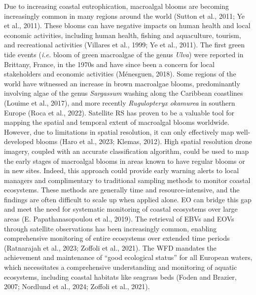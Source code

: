 \documentclass[
  letterpaper,
  11pt,
  english,
  singlespacing,
  headsepline]{MastersDoctoralThesis}
\begin{document}
\begin{spacing}{1.5}
Due to increasing coastal eutrophication, macroalgal blooms are becoming
increasingly common in many regions around the world (Sutton et al.,
2011; Ye et al., 2011). These blooms can have negative impacts on human
health and local economic activities, including human health, fishing
and aquaculture, tourism, and recreational activities (Villares et al.,
1999; Ye et al., 2011). The first green tide events (\emph{i.e.} bloom
of green macroalgae of the genus \emph{Ulva}) were reported in Brittany,
France, in the 1970s and have since been a concern for local
stakeholders and economic activities (Ménesguen, 2018). Some regions of
the world have witnessed an increase in brown macroalgae blooms,
predominantly involving algae of the genus \emph{Sargassum} washing
along the Caribbean coastlines (Louime et al., 2017), and more recently
\emph{Rugulopteryx okamurea} in southern Europe (Roca et al., 2022).
Satellite RS has proven to be a valuable tool for mapping the spatial
and temporal extent of macroalgal blooms worldwide. However, due to
limitations in spatial resolution, it can only effectively map
well-developed blooms (Haro et al., 2023; Klemas, 2012). High spatial
resolution drone imagery, coupled with an accurate classification
algorithm, could be used to map the early stages of macroalgal blooms in
areas known to have regular blooms or in new sites. Indeed, this
approach could provide early warning alerts to local managers and
complimentary to traditional sampling methods to monitor coastal
ecosystems. These methods are generally time and resource-intensive, and
the findings are often difficult to scale up when applied alone. EO can
bridge this gap and meet the need for systematic monitoring of coastal
ecosystems over large areas (E. Papathanasopoulou et al., 2019). The
retrieval of EBVs and EOVs through satellite observations has been
increasingly common, enabling comprehensive monitoring of entire
ecosystems over extended time periods (Ratnarajah et al., 2023; Zoffoli
et al., 2021). The WFD mandates the achievement and maintenance of
``good ecological status'' for all European waters, which necessitates a
comprehensive understanding and monitoring of aquatic ecosystems,
including coastal habitats like seagrass beds (Foden and Brazier, 2007;
Nordlund et al., 2024; Zoffoli et al., 2021).


\end{spacing}
\end{document}
